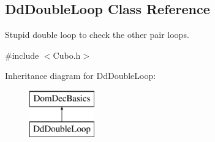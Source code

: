 \hypertarget{classDdDoubleLoop}{}\subsection{Dd\+Double\+Loop Class Reference}
\label{classDdDoubleLoop}


Stupid double loop to check the other pair loops.  




{\ttfamily \#include $<$Cubo.\+h$>$}

Inheritance diagram for Dd\+Double\+Loop\+:\begin{figure}[H]
\begin{center}
\leavevmode
\includegraphics[height=2.000000cm]{classDdDoubleLoop}
\end{center}
\end{figure}
